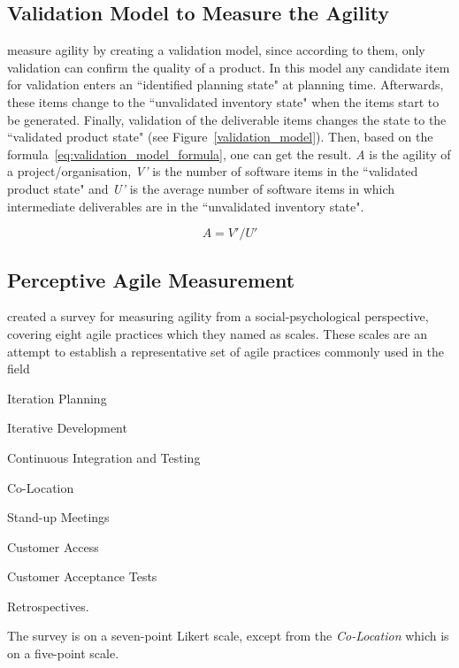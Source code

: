 \subsection{Validation Model to Measure the Agility}
\citet{validation_model} measure agility by creating a validation model, since according to them, only validation can confirm the quality of a product. In this model any candidate item for validation enters an ``identified planning state" at planning time. Afterwards, these items change to the ``unvalidated inventory state" when the items start to be generated. Finally, validation of the deliverable items changes the state to the ``validated product state" (see Figure~\ref{validation_model}). Then, based on the formula~\eqref{eq:validation_model_formula}, one can get the result. \textit{A} is the agility of a project/organisation, \textit{V'} is the number of software items in the ``validated product state" and \textit{U'} is the average number of software items in which intermediate deliverables are in the ``unvalidated inventory state".

\begin{equation} \label{eq:validation_model_formula}  A = V'/U' \end{equation}

\subsection{Perceptive Agile Measurement}
\citet{pam} created a survey for measuring agility from a social-psychological perspective, covering eight agile practices which they named as scales. These scales are an attempt to establish a representative set of agile practices commonly used in the field

\begin{inparaenum} [a\upshape)]
\item Iteration Planning
\item Iterative Development
\item Continuous Integration and Testing
\item Co-Location
\item Stand-up Meetings
\item Customer Access
\item Customer Acceptance Tests
\item Retrospectives.
\end{inparaenum} The survey is on a seven-point Likert scale, except from the \textit{Co-Location} which is on a five-point scale.

